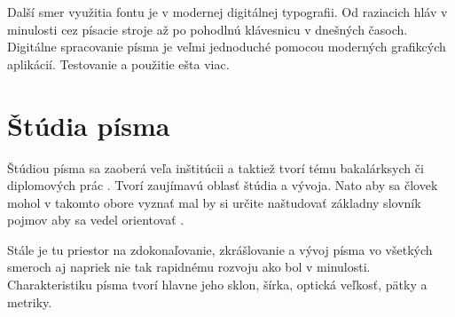 \documentclass[a4paper, 11pt]{article}
\begin{document}
Další smer využitia fontu je v modernej digitálnej typografii. Od raziacich hláv v minulosti cez písacie stroje až po pohodlnú klávesnicu v dnešných časoch. Digitálne spracovanie písma je veľmi jednoduché pomocou moderných grafikcých aplikácií. Testovanie a použitie ešta viac.

\section{Štúdia písma}
Štúdiou písma sa zaoberá veľa inštitúcii a taktiež tvorí tému bakalárksych či diplomových prác \cite{thesis:Jiricek} \cite{thesis:Zankofski}. Tvorí zaujímavú oblasť štúdia a vývoja. Nato aby sa človek mohol v takomto obore vyznať mal by si určite naštudovať základny slovník pojmov aby sa vedel orientovať \cite{misc:dictionary}.

Stále je tu priestor na zdokonaľovanie, zkrášlovanie a vývoj písma vo všetkých smeroch aj napriek nie tak rapidnému rozvoju ako bol v minulosti. Charakteristiku písma tvorí hlavne jeho sklon, šírka, optická veľkosť, pätky a metriky.

\newpage

\end{document}
